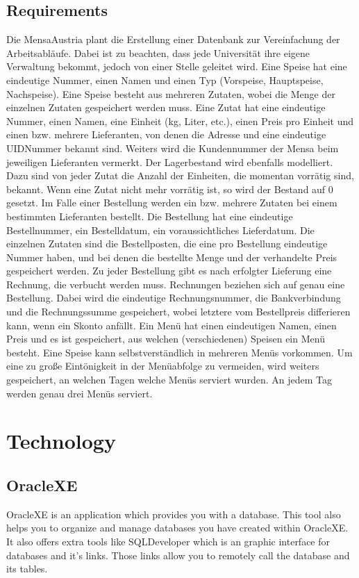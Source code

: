\documentclass[11pt,a4paper]{article}
\begin{document}
\subsection{Requirements}
Die MensaAustria plant die Erstellung einer Datenbank zur Vereinfachung der Arbeitsabläufe. Dabei
ist zu beachten, dass jede Universität ihre eigene Verwaltung bekommt, jedoch von einer Stelle
geleitet wird.
Eine Speise hat eine eindeutige Nummer, einen Namen und einen Typ (Vorspeise, Hauptspeise,
Nachspeise). Eine Speise besteht aus mehreren Zutaten, wobei die Menge der einzelnen Zutaten
gespeichert werden muss.
Eine Zutat hat eine eindeutige Nummer, einen Namen, eine Einheit (kg, Liter, etc.), einen Preis pro
Einheit und einen bzw. mehrere Lieferanten, von denen die Adresse und eine eindeutige
UIDNummer bekannt sind. Weiters wird die Kundennummer der Mensa beim jeweiligen Lieferanten
vermerkt. Der Lagerbestand wird ebenfalls modelliert. Dazu sind von jeder Zutat die Anzahl der
Einheiten, die momentan vorrätig sind, bekannt. Wenn eine Zutat nicht mehr vorrätig ist, so wird der
Bestand auf 0 gesetzt.
Im Falle einer Bestellung werden ein bzw. mehrere Zutaten bei einem bestimmten Lieferanten
bestellt. Die Bestellung hat eine eindeutige Bestellnummer, ein Bestelldatum, ein voraussichtliches
Lieferdatum. Die einzelnen Zutaten sind die Bestellposten, die eine pro Bestellung eindeutige
Nummer haben, und bei denen die bestellte Menge und der verhandelte Preis gespeichert werden.
Zu jeder Bestellung gibt es nach erfolgter Lieferung eine Rechnung, die verbucht werden muss.
Rechnungen beziehen sich auf genau eine Bestellung. Dabei wird die eindeutige Rechnungsnummer,
die Bankverbindung und die Rechnungssumme gespeichert, wobei letztere vom Bestellpreis
differieren kann, wenn ein Skonto anfällt.
Ein Menü hat einen eindeutigen Namen, einen Preis und es ist gespeichert, aus welchen
(verschiedenen) Speisen ein Menü besteht. Eine Speise kann selbstverständlich in mehreren Menüs
vorkommen.
Um eine zu große Eintönigkeit in der Menüabfolge zu vermeiden, wird weiters gespeichert, an
welchen Tagen welche Menüs serviert wurden. An jedem Tag werden genau drei Menüs serviert.

\newpage
\section{Technology}
\subsection{OracleXE}
OracleXE is an application which provides you with a database. This tool also helps you to organize and manage databases you have created within OracleXE. It also offers extra tools like SQLDeveloper which is an graphic interface for databases and it's links. Those links allow you to remotely call the database and its tables.
\end{document}
